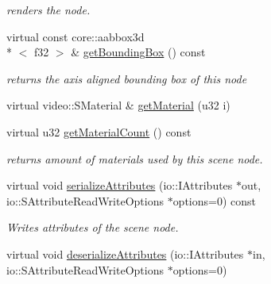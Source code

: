 \begin{DoxyCompactItemize}
\begin{DoxyCompactList}\small\item\em renders the node. \end{DoxyCompactList}\item 
\hypertarget{classirr_1_1scene_1_1_c_mesh_scene_node_ad3ad61f0bb8c9be973bdaec7308c7d91}{virtual const core\-::aabbox3d\\*
$<$ f32 $>$ \& \hyperlink{classirr_1_1scene_1_1_c_mesh_scene_node_ad3ad61f0bb8c9be973bdaec7308c7d91}{get\-Bounding\-Box} () const }\label{classirr_1_1scene_1_1_c_mesh_scene_node_ad3ad61f0bb8c9be973bdaec7308c7d91}

\begin{DoxyCompactList}\small\item\em returns the axis aligned bounding box of this node \end{DoxyCompactList}\item 
virtual video\-::\-S\-Material \& \hyperlink{classirr_1_1scene_1_1_c_mesh_scene_node_a3bc0e1b2117eeeecff7c115755f8ff20}{get\-Material} (u32 i)
\item 
\hypertarget{classirr_1_1scene_1_1_c_mesh_scene_node_a5b9f19e2a879e105a0337ce7d948bd72}{virtual u32 \hyperlink{classirr_1_1scene_1_1_c_mesh_scene_node_a5b9f19e2a879e105a0337ce7d948bd72}{get\-Material\-Count} () const }\label{classirr_1_1scene_1_1_c_mesh_scene_node_a5b9f19e2a879e105a0337ce7d948bd72}

\begin{DoxyCompactList}\small\item\em returns amount of materials used by this scene node. \end{DoxyCompactList}\item 
\hypertarget{classirr_1_1scene_1_1_c_mesh_scene_node_a3acc66ee167fd438c798cc5081266512}{virtual void \hyperlink{classirr_1_1scene_1_1_c_mesh_scene_node_a3acc66ee167fd438c798cc5081266512}{serialize\-Attributes} (io\-::\-I\-Attributes $\ast$out, io\-::\-S\-Attribute\-Read\-Write\-Options $\ast$options=0) const }\label{classirr_1_1scene_1_1_c_mesh_scene_node_a3acc66ee167fd438c798cc5081266512}

\begin{DoxyCompactList}\small\item\em Writes attributes of the scene node. \end{DoxyCompactList}\item 
\hypertarget{classirr_1_1scene_1_1_c_mesh_scene_node_ab9df6df7e64a378d23a32548db1350e7}{virtual void \hyperlink{classirr_1_1scene_1_1_c_mesh_scene_node_ab9df6df7e64a378d23a32548db1350e7}{deserialize\-Attributes} (io\-::\-I\-Attributes $\ast$in, io\-::\-S\-Attribute\-Read\-Write\-Options $\ast$options=0)}\label{classirr_1_1scene_1_1_c_mesh_scene_node_ab9df6df7e64a378d23a32548db1350e7}


\end{DoxyCompactItemize}
